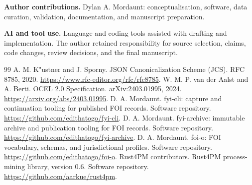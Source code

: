 \documentclass[11pt]{article}
\begin{document}
\textbf{Author contributions.} Dylan A. Mordaunt: conceptualisation, software, data curation,
validation, documentation, and manuscript preparation.

\textbf{AI and tool use.} Language and coding tools assisted with drafting and implementation.
The author retained responsibility for source selection, claims, code changes, review decisions,
and the final manuscript.

\begin{thebibliography}{99}
 A. M. K{"u}stner and J. Sporny. JSON Canonicalization Scheme (JCS). RFC 8785,
2020. \url{https://www.rfc-editor.org/rfc/rfc8785}.
 W. M. P. van der Aalst and A. Berti. OCEL 2.0 Specification. arXiv:2403.01995,
2024. \url{https://arxiv.org/abs/2403.01995}.
 D. A. Mordaunt. fyi-cli: capture and continuation tooling for published FOI
records. Software repository. \url{https://github.com/edithatogo/fyi-cli}.
 D. A. Mordaunt. fyi-archive: immutable archive and publication tooling for
FOI records. Software repository. \url{https://github.com/edithatogo/fyi-archive}.
 D. A. Mordaunt. foi-o: FOI vocabulary, schemas, and jurisdictional profiles.
Software repository. \url{https://github.com/edithatogo/foi-o}.
 Rust4PM contributors. Rust4PM process-mining library, version 0.6.
Software repository. \url{https://github.com/aarkue/rust4pm}.
\end{thebibliography}
\end{document}
